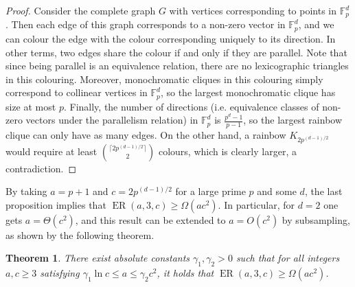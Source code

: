 \documentclass[10pt,a4paper]{article}
\theoremstyle{plain}
\newtheorem{theorem}{Theorem}[section]
\theoremstyle{definition}
\newcommand{\offerado}[3]{\operatorname{ER}(#1,#2,#3)}
\begin{document}
\begin{proof}
    Consider the complete graph $G$ with vertices corresponding to points in $\mathbb{F}_p^d$. Then each edge of this graph corresponds to a non-zero vector in $\mathbb{F}_p^d$, and we can colour the edge with the colour corresponding uniquely to its direction. In other terms, two edges share the colour if and only if they are parallel. Note that since being parallel is an equivalence relation, there are no lexicographic triangles in this colouring. Moreover, monochromatic cliques in this colouring simply correspond to collinear vertices in $\mathbb{F}_p^d$, so the largest monochromatic clique has size at most $p$. Finally, the number of directions (i.e. equivalence classes of non-zero vectors under the parallelism relation) in $\mathbb{F}_p^d$ is $\frac{p^d-1}{p-1}$, so the largest rainbow clique can only have as many edges. On the other hand, a rainbow $K_{2p^{(d-1)/2}}$ would require at least $\binom{\lceil2p^{(d-1)/2}\rceil}{2}$ colours, which is clearly larger, a contradiction.
\end{proof}

By taking $a=p+1$ and $c=2p^{(d-1)/2}$ for a large prime $p$ and some $d$, the last proposition implies that $\offerado{a}{3}{c}\ge \Omega(ac^2)$. In particular, for $d=2$ one gets $a=\Theta(c^2)$, and this result can be extended to $a=O(c^2)$ by subsampling, as shown by the following theorem.

\begin{theorem}\label{thm-b3-small-a}
    There exist absolute constants $\gamma_1,\gamma_2>0$ such that for all integers $a,c\ge 3$ satisfying $\gamma_1\ln c\le a\le \gamma_2 c^2$, it holds that $\offerado a3c \ge \Omega(ac^2)$.
\end{theorem}
\end{document}
